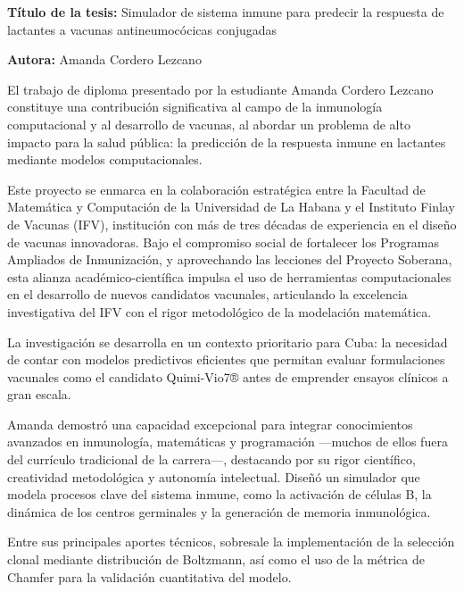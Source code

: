 \begin{opinion}	
\textbf{Título de la tesis:} Simulador de sistema inmune para predecir la respuesta de lactantes a vacunas antineumocócicas conjugadas

\textbf{Autora:} Amanda Cordero Lezcano

El trabajo de diploma presentado por la estudiante Amanda Cordero Lezcano constituye una contribución significativa al campo de la inmunología computacional y al desarrollo de vacunas, al abordar un problema de alto impacto para la salud pública: la predicción de la respuesta inmune en lactantes mediante modelos computacionales.

Este proyecto se enmarca en la colaboración estratégica entre la Facultad de Matemática y Computación de la Universidad de La Habana y el Instituto Finlay de Vacunas (IFV), institución con más de tres décadas de experiencia en el diseño de vacunas innovadoras. Bajo el compromiso social de fortalecer los Programas Ampliados de Inmunización, y aprovechando las lecciones del Proyecto Soberana, esta alianza académico-científica impulsa el uso de herramientas computacionales en el desarrollo de nuevos candidatos vacunales, articulando la excelencia investigativa del IFV con el rigor metodológico de la modelación matemática.

La investigación se desarrolla en un contexto prioritario para Cuba: la necesidad de contar con modelos predictivos eficientes que permitan evaluar formulaciones vacunales como el candidato Quimi-Vio7® antes de emprender ensayos clínicos a gran escala.

Amanda demostró una capacidad excepcional para integrar conocimientos avanzados en inmunología, matemáticas y programación —muchos de ellos fuera del currículo tradicional de la carrera—, destacando por su rigor científico, creatividad metodológica y autonomía intelectual. Diseñó un simulador que modela procesos clave del sistema inmune, como la activación de células B, la dinámica de los centros germinales y la generación de memoria inmunológica.

Entre sus principales aportes técnicos, sobresale la implementación de la selección clonal mediante distribución de Boltzmann, así como el uso de la métrica de Chamfer para la validación cuantitativa del modelo. 


\end{opinion}
